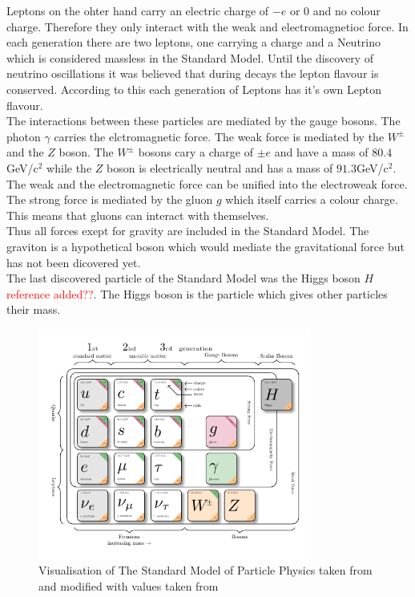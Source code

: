 Leptons on the ohter hand carry an electric charge of $-e$ or $0$ and no colour charge. Therefore they only interact with the weak and electromagnetioc force. In each generation there are two leptons, one carrying a charge and a Neutrino which is considered massless in the Standard Model. Until the discovery of neutrino oscillations it was believed that during decays the lepton flavour is conserved. According to this each generation of Leptons has it's own Lepton flavour. 
\\
The interactions between these particles are mediated by the gauge bosons. The photon $\gamma$ carries the elctromagnetic force. The weak force is mediated by the $W^\pm$ and the $Z$ boson. 
The $W^\pm$ bosons cary a charge of $\pm e$ and have a mass of $80.4 $GeV/c$^2$ while the $Z$ boson is electrically neutral and has a mass of $91.3 $GeV/c$^2$.
The weak and the electromagnetic force can be unified into the electroweak force. The strong force is mediated by the gluon $g$ which itself carries a colour charge. This means that gluons can interact with themselves.\\
Thus all forces exept for gravity are included in the Standard Model. The graviton is a hypothetical boson which would mediate the gravitational force but has not been dicovered yet.\\
The last discovered particle of the Standard Model was the Higgs boson $H$ \textcolor{red}{reference added??}. The Higgs boson is the particle which gives other particles their mass. 
\begin{figure}
    \centering
    \includegraphics[width=0.8\textwidth]{figures/standard_model_pdf.pdf}
    \caption{Visualisation of The Standard Model of Particle Physics taken from\cite{texample_model_physics} and modified with values taken from\cite{pdg2025}}\label{fig:standard_model}
\end{figure}


